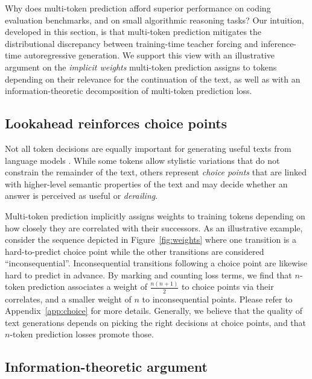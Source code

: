 
\label{sec:discussion}

Why does multi-token prediction afford superior performance on coding evaluation benchmarks, and on small algorithmic reasoning tasks?
Our intuition, developed in this section, is that multi-token prediction mitigates the distributional discrepancy between training-time teacher forcing and inference-time autoregressive generation.
We support this view with an illustrative argument on the \emph{implicit weights} multi-token prediction assigns to tokens depending on their relevance for the continuation of the text, as well as with an information-theoretic decomposition of multi-token prediction loss.


\subsection{Lookahead reinforces choice points}
\label{sect:derailing}

Not all token decisions are equally important for generating useful texts from language models \citep{bachmann2024pitfalls,lin2024rho1}.
While some tokens allow stylistic variations that do not constrain the remainder of the text, others represent \emph{choice points} that are linked with higher-level semantic properties of the text and may decide whether an answer is perceived as useful or \emph{derailing}.

Multi-token prediction implicitly assigns weights to training tokens depending on how closely they are correlated with their successors.
As an illustrative example, consider the sequence depicted in Figure~\ref{fig:weights} where one transition is a hard-to-predict choice point while the other transitions are considered ``inconsequential''. Inconsequential transitions following a choice point are likewise hard to predict in advance. By marking and counting loss terms, we find that $n$-token prediction associates a weight of $\frac{n(n+1)}{2}$ to choice points via their correlates, and a smaller weight of $n$ to inconsequential points.
Please refer to Appendix~\ref{app:choice} for more details.
Generally, we believe that the quality of text generations depends on picking the right decisions at choice points, and that $n$-token prediction losses promote those.





\subsection{Information-theoretic argument}
\label{sect:mismatch}

